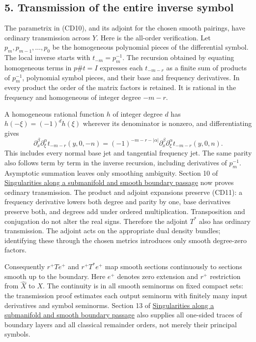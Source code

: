 \documentclass[
  11pt,
]{article}
\begin{document}
\subsection{5. Transmission of the entire inverse
symbol}\label{transmission-of-the-entire-inverse-symbol}

The parametrix in (CD10), and its adjoint for the chosen smooth
pairings, have ordinary transmission across \(Y\). Here is the all-order
verification. Let \(p_m,p_{m-1},\ldots,p_0\) be the homogeneous
polynomial pieces of the differential symbol. The local inverse starts
with \(t_{-m}=p_m^{-1}\). The recursion obtained by equating homogeneous
terms in \(p\#t=I\) expresses each \(t_{-m-r}\) as a finite sum of
products of \(p_m^{-1}\), polynomial symbol pieces, and their base and
frequency derivatives. In every product the order of the matrix factors
is retained. It is rational in the frequency and homogeneous of integer
degree \(-m-r\).

A homogeneous rational function \(h\) of integer degree \(d\) has
\(h(-\xi)=(-1)^dh(\xi)\) wherever its denominator is nonzero, and
differentiating gives \[
\partial_x^\beta\partial_\xi^\alpha t_{-m-r}(y,0,-n)
=(-1)^{-m-r-|\alpha|}
\partial_x^\beta\partial_\xi^\alpha t_{-m-r}(y,0,n).
\tag{CD11}
\] This includes every normal base jet and tangential frequency jet. The
same parity also follows term by term in the inverse recursion,
including derivatives of \(p_m^{-1}\). Asymptotic summation leaves only
smoothing ambiguity. Section 10 of
\href{conormal-transmission.pdf}{Singularities along a submanifold and
smooth boundary passage} now proves ordinary transmission. The product
and adjoint expansions preserve (CD11): a frequency derivative lowers
both degree and parity by one, base derivatives preserve both, and
degrees add under ordered multiplication. Transposition and conjugation
do not alter the real signs. Therefore the adjoint \(T^*\) also has
ordinary transmission. The adjoint acts on the appropriate dual density
bundles; identifying these through the chosen metrics introduces only
smooth degree-zero factors.

Consequently \(r^+Te^+\) and \(r^+T^*e^+\) map smooth sections
continuously to sections smooth up to the boundary. Here \(e^+\) denotes
zero extension and \(r^+\) restriction from \(\widehat X\) to \(X\). The
continuity is in all smooth seminorms on fixed compact sets: the
transmission proof estimates each output seminorm with finitely many
input derivatives and symbol seminorms. Section 13 of
\href{conormal-transmission.pdf}{Singularities along a submanifold and
smooth boundary passage} also supplies all one-sided traces of boundary
layers and all classical remainder orders, not merely their principal
symbols.
\end{document}
